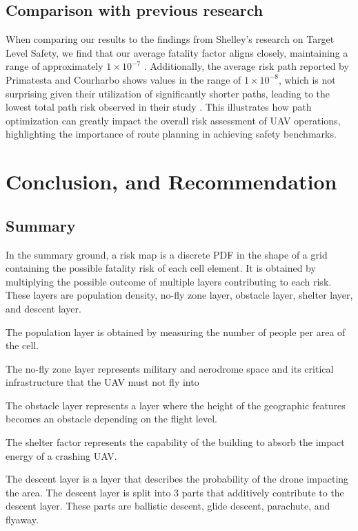 \documentclass[12pt]{report}
\begin{document}
    \section{Comparison with previous research}
    When comparing our results to the findings from Shelley’s research on Target Level Safety, we find that our average
    fatality factor aligns closely, maintaining a range of approximately \(1 \times 10^{-7}\) \cite{shelley_model_2016}.
    Additionally, the average risk path reported by Primatesta and Courharbo shows values in the range of \(1 \times
    10^{-8}\), which is not surprising given their utilization of significantly shorter paths, leading to the lowest
    total path risk observed in their study \cite{primatesta_risk-based_2020}. This illustrates how path optimization
    can greatly impact the overall risk assessment of UAV operations, highlighting the importance of route planning in
    achieving safety benchmarks.



    
\chapter{Conclusion, and Recommendation}
    \section{Summary}
    In the summary ground, a risk map is a discrete PDF in the shape of a grid containing the possible fatality risk of
    each cell element. It is obtained by multiplying the possible outcome of multiple layers contributing to each risk.
    These layers are population density, no-fly zone layer, obstacle layer, shelter layer, and descent layer.
    \begin{myitemize}
    \item The population layer is obtained by measuring the number of people per area of the cell.
    \item The no-fly zone layer represents military and aerodrome space and its critical infrastructure that the UAV
    must not fly into
    \item The obstacle layer represents a layer where the height of the geographic features becomes an obstacle
    depending on the flight level.
    \item The shelter factor represents the capability of the building to absorb the impact energy of a crashing UAV.
    \item The descent layer is a layer that describes the probability of the drone impacting the area. The descent layer
    is split into 3 parts that additively contribute to the descent layer. These parts are ballistic descent, glide
    descent, parachute, and flyaway.        
    \end{myitemize}
\end{document}
